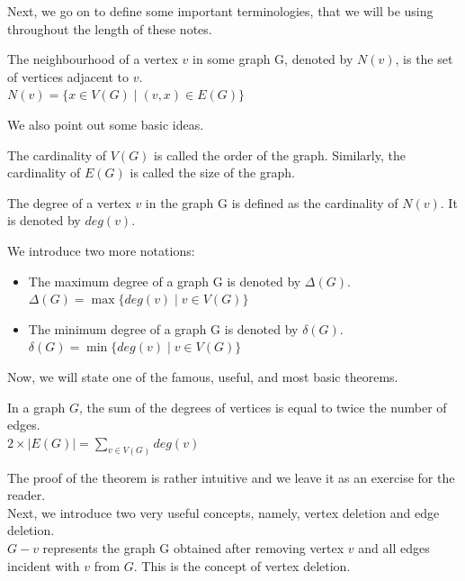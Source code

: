 \documentclass[../basic_graph_theory.tex]{subfiles}
\begin{document}
Next, we go on to define some important terminologies, that we will be using throughout the length of these notes.
\begin{defn}
    The neighbourhood of a vertex $v$ in some graph G, denoted by $N(v)$, is the set of vertices adjacent to $v$.\\
    $N(v) = \{x \in V(G) \mid (v,x) \in E(G)\}$
\end{defn}

We also point out some basic ideas.
\begin{defn}
    The cardinality of $V(G)$ is called the order of the graph. Similarly, the cardinality of $E(G)$ is called the size of the graph.
\end{defn}

\begin{defn}
    The degree of a vertex $v$ in the graph G is defined as the cardinality of $N(v)$. It is denoted by $deg(v)$.
\end{defn}

We introduce two more notations:
\begin{itemize}
    \item The maximum degree of a graph G is denoted by $\Delta(G)$.\\
          $\Delta(G) = \max\{deg(v) \mid v \in V(G)\}$
    \item The minimum degree of a graph G is denoted by $\delta(G)$.\\
          $\delta(G) = \min\{deg(v) \mid v \in V(G)\}$
\end{itemize}

Now, we will state one of the famous, useful, and most basic theorems.
\begin{thm}
    \label{ref:3}
    In a graph $G$, the sum of the degrees of vertices is equal to twice the number of edges.\\
    $2 \times |E(G)|=\sum_{v \in V(G)}deg(v)$
\end{thm}

The proof of the theorem is rather intuitive and we leave it as an exercise for the reader.\\

Next, we introduce two very useful concepts, namely, vertex deletion and edge deletion.\\

$G-v$ represents the graph G obtained after removing vertex $v$ and all edges incident with $v$ from $G$. This is the concept of vertex deletion.\\
\end{document}
